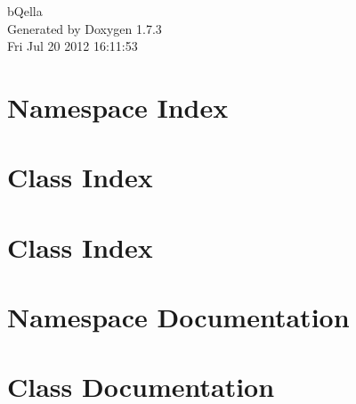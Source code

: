 \documentclass[a4paper]{book}
\begin{document}
\hypersetup{pageanchor=false}
\begin{titlepage}
\vspace*{7cm}
\begin{center}
{\Large bQella }\\
\vspace*{1cm}
{\large Generated by Doxygen 1.7.3}\\
\vspace*{0.5cm}
{\small Fri Jul 20 2012 16:11:53}\\
\end{center}
\end{titlepage}
\clearemptydoublepage
{}
\tableofcontents
\clearemptydoublepage
{}
\hypersetup{pageanchor=true}
\chapter{Namespace Index}

\chapter{Class Index}

\chapter{Class Index}

\chapter{Namespace Documentation}

\chapter{Class Documentation}













































\printindex
\end{document}
